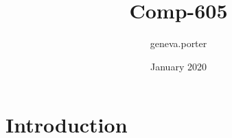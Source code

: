 \documentclass{article}
\title{Comp-605}
\author{geneva.porter }
\date{January 2020}
\begin{document}
\maketitle

\section{Introduction}
\end{document}
